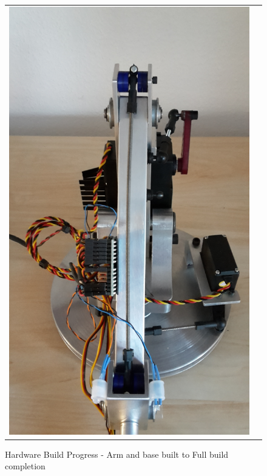 \documentclass[progress]{cmpreport}
\begin{document}
\begin{figure}[H]
	\centering
	\caption{Hardware Build Progress - Arm and base built to Full build completion }
	\begin{tabular}{ll}
		\includegraphics[trim=10cm 2cm 3cm 4cm, clip=true, totalheight=0.28\textheight, angle=-90]{photos/Day36-pt1.jpg}
		&

\end{tabular}
\end{figure}
\end{document}
